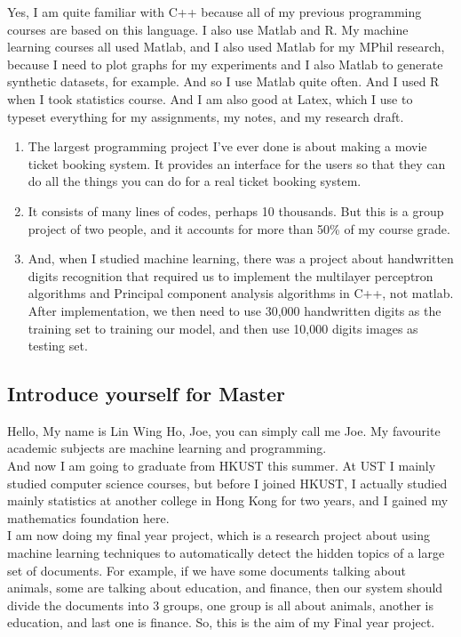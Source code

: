 \documentclass[12pt, landscape]{article}
\begin{document}
\begin{multicols}{2}
Yes, I am quite familiar with C++ because all of my previous programming courses are based on this language. I also use Matlab and R. My machine learning courses all used Matlab, and I also used Matlab for my MPhil research, because I need to plot graphs for my experiments and I also Matlab to generate synthetic datasets, for example. And so I use Matlab quite often. And I used R when I took statistics course. And I am also good at Latex, which I use to typeset everything for my assignments, my notes, and my research draft.
 \begin{enumerate}
 	\item   The largest programming project I've ever done is about making a movie ticket booking system. It provides an interface for the users so that they can do all the things you can do for a real ticket booking system.
 	\item  It consists of many lines of codes, perhaps 10 thousands. But this is a group project of two people, and it accounts for more than 50\% of my course grade. 
 	\item And, when I studied machine learning, there was a project about handwritten digits recognition that required us to implement the multilayer perceptron algorithms and  Principal component analysis algorithms in C++, not matlab. After implementation, we then need to  use 30,000 handwritten digits as the training set to training our model, and then  use 10,000 digits images as testing set.
 \end{enumerate}

 
\subsection{Introduce yourself for Master}
Hello, My name is Lin Wing Ho, Joe, you can simply call me Joe. My favourite academic subjects are machine learning and programming. \\

And now I am going to graduate from HKUST this summer. At UST I mainly studied computer science courses, but before I joined HKUST, I actually studied mainly statistics at another college in Hong Kong for two years, and I gained my mathematics foundation here.\\

I am now doing my final year project, which is a research project about using machine learning techniques to automatically detect the hidden topics of a large set of documents. For example, if we have some documents talking about animals, some are talking about education, and finance, then our system should divide the documents into 3 groups, one group is all about animals, another is education, and last one is finance.  So, this is the aim of my Final year project.\\


\end{multicols}
\end{document}
